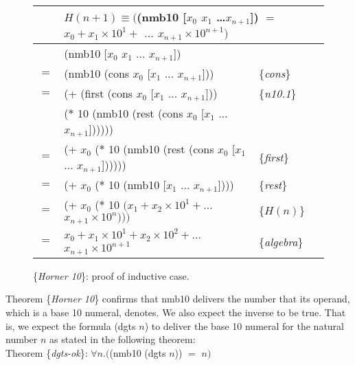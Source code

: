 \begin{figure}
\begin{center}
\begin{tabular}{rlll}
&\multicolumn{3}{l}{$H(n+1) \equiv ($\textsf{(nmb10 [$x_0$ $x_1$ \dots $x_{n+1}$])} $=$
$x_0 + x_1 \times 10^1 +$  $\dots$ $x_{n+1} \times 10^{n+1})$}\\
\hline
    & \textsf{(nmb10 [$x_0$ $x_1$ $\dots$ $x_{n+1}$])}           & &\\
$=$ & \textsf{(nmb10 (cons $x_0$ [$x_1$ $\dots$ $x_{n+1}$]))}    & \{\emph{cons}\}&\\
$=$ & \textsf{(+ (first (cons $x_0$ [$x_1$ $\dots$ $x_{n+1}$]))}  & \{\emph{n10.1}\} &\\
    & \phantom{\textsf{(+ }}\textsf{($*$ 10 (nmb10 (rest (cons $x_0$ [$x_1$ $\dots$ $x_{n+1}$])))))} &&\\
$=$ & \textsf{(+ $x_0$ ($*$ 10 (nmb10 (rest (cons $x_0$ [$x_1$ $\dots$ $x_{n+1}$])))))}      & \{\emph{first}\} &\\
$=$ & \textsf{(+ $x_0$ ($*$ 10 (nmb10 [$x_1$ $\dots$ $x_{n+1}$])))}                          & \{\emph{rest}\}&\\
$=$ & \textsf{(+ $x_0$ ($*$ 10 $(x_1 + x_2 \times 10^1 + \dots$ $x_{n+1} \times 10^{n})))$}  & \{$H(n)$\}&\\
$=$ & $x_0 + x_1 \times 10^1 + x_2 \times 10^2 + \dots$ $x_{n+1} \times 10^{n+1}$   & \{\emph{algebra}\} &\\
\end{tabular}
\end{center}
\caption{\{\emph{Horner 10}\}: proof of inductive case.}
\label{fig:horner10-induc}
\end{figure}

Theorem \{\emph{Horner 10}\} confirms that \textsf{nmb10} delivers the
number that its operand, which is a base 10 numeral, denotes.
We also expect the inverse to be true.
That is, we expect the formula \textsf{(dgts $n$)}
to deliver the base 10 numeral for the natural number $n$
as stated in the following theorem:
\label{dgts-ok}
\vspace{2mm}\\
\hspace*{5mm}Theorem \{\emph{dgts-ok}\}:
$\forall n.($\textsf{(nmb10 (dgts $n$))} $=$ $n)$
\vspace{2mm}

